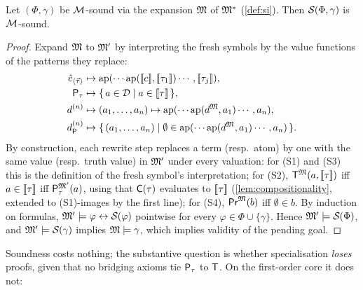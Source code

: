 \begin{theorem}
\label{thm:spec-sound}
Let $(\Phi, \gamma)$ be $\mathcal{M}$-sound via the expansion $\mathfrak{M}$ of
$\mathfrak{M}^{*}$ (\cref{def:si}).  Then $\mathcal{S}_{}(\Phi, \gamma)$ is
$\mathcal{M}$-sound.
\end{theorem}

\begin{proof}
Expand $\mathfrak{M}$ to $\mathfrak{M}'$ by interpreting the fresh symbols by the
value functions of the patterns they replace:
\begin{align*}
  \hat{c}_{\langle\tup{\tau}\rangle} &\mapsto
    \ap(\cdots \ap(\sem{c}, \sem{\tau_1}) \cdots, \sem{\tau_j}), \\
  \guard{\tau} &\mapsto \setof{a \in \Dom}{a \in \sem{\tau}}, \\
  d^{(n)} &\mapsto (a_1, \ldots, a_n) \mapsto
    \ap(\cdots \ap(d^{\FM}, a_1)\cdots, a_n), \\
  d^{(n)}_{\mathsf{P}} &\mapsto
    \setof{(a_1, \ldots, a_n)}{\emptyset \in
      \ap(\cdots \ap(d^{\FM}, a_1)\cdots, a_n)} .
\end{align*}
By construction, each rewrite step replaces a term (resp.\ atom) by
one with the same value (resp.\ truth value) in $\mathfrak{M}'$ under every
valuation: for (S1) and (S3) this is the definition of the fresh
symbol's interpretation; for (S2), $\mathsf{T}^{\mathfrak{M}}(a, [\![ \tau ]\!])$
iff $a \in [\![ \tau ]\!]$ iff $\mathsf{P}_{\tau}^{\mathfrak{M}'}(a)$, using that
$\mathsf{C}(\tau)$ evaluates to $[\![ \tau ]\!]$ (\cref{lem:compositionality},
extended to (S1)-images by the first line); for (S4), $\mathsf{Pr}^{\mathfrak{M}}(b)$
iff $\emptyset \in b$.  By induction on formulas, $\mathfrak{M}' \models
\varphi \leftrightarrow \mathcal{S}_{}(\varphi)$ pointwise for every
$\varphi \in \Phi \cup \{\gamma\}$.  Hence $\mathfrak{M}' \models
\mathcal{S}_{}(\Phi)$, and $\mathfrak{M}' \models \mathcal{S}_{}(\gamma)$ implies $\mathfrak{M}
\models \gamma$, which implies validity of the pending goal.
\end{proof}

Soundness costs nothing; the substantive question is whether
specialisation \emph{loses} proofs, given that no bridging axioms
tie $\mathsf{P}_{\tau}$ to $\mathsf{T}$.  On the first-order core it does
not:

